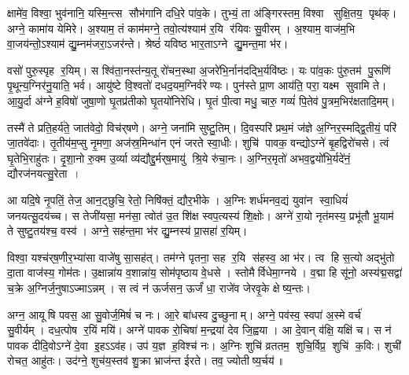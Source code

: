 क्षामे॑व॒ विश्वा॒ भुव॑नानि॒ यस्मि॒न्त्स सौभ॑गानि दधि॒रे पा॑व॒के। तुभ्यं॒ ता अ॑ङ्गिरस्तम॒ विश्वा सुक्षि॒तय॒ पृथ॑क्। अग्ने॒ कामा॑य येमिरे। अ॒श्याम॒ तं काम॑मग्ने॒ तवो॒त्य॑श्याम॑ र॒यि र॑यिवः सु॒वीरम्। अ॒श्याम॒ वाज॑म॒भि वा॒जय॑न्तो॒ऽश्याम॑ द्यु॒म्नम॑जरा॒ऽजर॑न्ते। श्रेष्ठं॑ यविष्ठ भार॒ताऽग्ने द्यु॒मन्त॒मा भ॑र। 

वसो॑ पुरु॒स्पृह र॒यिम्। स श्वि॑ता॒नस्त॑न्य॒तू रो॑चन॒स्था अ॒जरे॑भि॒र्नान॑दद्भि॒र्यवि॑ष्ठः। यः पा॑व॒कः पु॑रु॒तम॑ पु॒रूणि॑ पृ॒थून्य॒ग्निर॑नु॒याति॒ भर्व\snn{}। आयु॑ष्टे वि॒श्वतो॑ दधद॒यम॒ग्निर्वरेण्यः। पुन॑स्ते प्रा॒ण आय॑ति॒ परा॒ यक्ष्म सुवामि ते। आ॒यु॒र्दा अ॑ग्ने ह॒विषो॑ जुषा॒णो घृ॒तप्र॑तीको घृ॒तयो॑निरेधि। घृ॒तं पी॒त्वा मधु॒ चारु॒ गव्यं॑ पि॒तेव॑ पु॒त्रम॒भिर॑क्षतादि॒मम्।

तस्मै॑ ते प्रति॒हर्य॑ते॒ जात॑वेदो॒ विच॑र्‌षणे। अग्ने॒ जना॑मि सुष्टु॒तिम्। दि॒वस्परि॑ प्रथ॒मं ज॑ज्ञे अ॒ग्निर॒स्मद्द्वि॒तीयं॒ परि॑ जा॒तवे॑दाः। तृ॒तीय॑म॒प्सु नृ॒मणा॒ अज॑स्र॒मिन्धा॑न एनं जरते स्वा॒धीः। शुचि॑ पावक॒ वन्द्योऽग्ने॑ बृ॒हद्विरो॑चसे। त्वं घृ॒तेभि॒राहु॑तः। दृ॒शा॒नो रु॒क्म उ॒र्व्या व्य॑द्यौद्दु॒र्मर्‌ष॒मायु॑ श्रि॒ये रु॑चा॒नः। अ॒ग्निर॒मृतो॑ अभव॒द्वयो॑भि॒र्यदे॑नं॒ द्यौरज॑नयत्सु॒रेता। 

आ यदि॒षे नृ॒पतिं॒ तेज॒ आन॒ट्छुचि॒ रेतो॒ निषि॑क्तं॒ द्यौर॒भीके।
अ॒ग्निः शर्ध॑मनव॒द्यं युवा॑न स्वा॒धियं॑ जनयत्सू॒दय॑च्च। स तेजी॑यसा॒ मन॑सा॒ त्वोत॑ उ॒त शि॑क्ष स्वप॒त्यस्य॑ शि॒क्षोः। अग्ने॑ रा॒यो नृत॑मस्य॒ प्रभू॑तौ भू॒याम॑ ते सुष्टु॒तय॑श्च॒ वस्व॑। अग्ने॒ सह॑न्त॒मा भ॑र द्यु॒म्नस्य॑ प्रा॒सहा॑ र॒यिम्।

 विश्वा॒ यश्च॑र्‌ष॒णीर॒भ्या॑सा वाजे॑षु सा॒सह॑त्। 
तम॑ग्ने पृतना॒ सह र॒यि स॑हस्व॒ आ भ॑र। त्व हि स॒त्यो अद्भु॑तो दा॒ता वाज॑स्य॒ गोम॑तः। उ॒क्षान्ना॑य व॒शान्ना॑य॒ सोम॑पृष्ठाय वे॒धसे। स्तोमैर्विधेमा॒ग्नये। व॒द्मा हि सू॑नो॒ अस्य॑द्म॒सद्वा॑ च॒क्रे अ॒ग्निर्ज॒नुषाऽज्माऽन्नम्। स त्वं न॑ ऊर्जसन॒ ऊर्जं॑ धा॒  राजे॑व जेरवृ॒के क्षेष्य॒न्तः।

अग्न॒ आयूषि पवस॒ आ सु॒वोर्ज॒मिषं॑ च नः। आ॒रे बा॑धस्व दु॒च्छुनाम्। अग्ने॒ पव॑स्व॒ स्वपा॑ अ॒स्मे वर्च॑ सु॒वीर्यम्। दध॒त्पोष र॒यिं मयि॑।
अग्ने॑ पावक रो॒चिषा॑ म॒न्द्रया॑ देव जि॒ह्वया। आ दे॒वान् व॑क्षि॒ यक्षि॑ च। स न॑ पावक दीदि॒वोऽग्ने॑ दे॒वा इ॒हऽऽव॑ह। उप॑ य॒ज्ञ ह॒विश्च॑ नः। अ॒ग्निः शुचि॑ व्रततम॒ शुचि॒र्विप्र॒ शुचि॑ क॒विः। शुची॑ रोचत॒ आहु॑तः। उद॑ग्ने॒ शुच॑य॒स्तव॑ शु॒क्रा भ्राज॑न्त ईरते। तव॒ ज्योतीष्य॒र्चय॑॥


